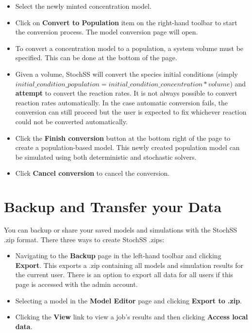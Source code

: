 \begin{itemize}
  \item Select the newly minted concentration model.
  \item Click on \textbf{Convert to Population} item on the right-hand toolbar to start the conversion process. The model conversion page will open.
  \item To convert a concentration model to a population, a system volume must be specified. This can be done at the bottom of the page.
  \item Given a volume, StochSS will convert the species initial conditions (simply $initial\_condition\_population = initial\_condition\_concentration * volume$) and \textbf{attempt} to convert the reaction rates. It is not always possible to convert reaction rates automatically. In the case automatic conversion fails, the conversion can still proceed but the user is expected to fix whichever reaction could not be converted automatically.
  \item Click the \textbf{Finish conversion} button at the bottom right of the page to create a population-based model. This newly created population model can be simulated using both deterministic and stochastic solvers.
  \item Click \textbf{Cancel conversion} to cancel the conversion.
\end{itemize}


\section{Backup and Transfer your Data}
You can backup or share your saved models and simulations with the StochSS .zip format. There three ways to create StochSS .zips:

\begin{itemize}
\item Navigating to the \textbf{Backup} page in the left-hand toolbar and clicking \textbf{Export}. This exports a .zip containing all models and simulation results for the current user. There is an option to export all data for all users if this page is accessed with the admin account.
\item Selecting a model in the \textbf{Model Editor} page and clicking \textbf{Export to .zip}.
\item Clicking the \textbf{View} link to view a job's results and then clicking \textbf{Access local data}.
\end{itemize}

